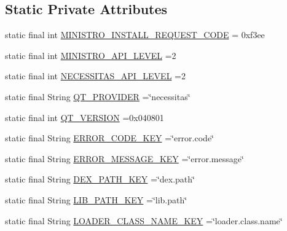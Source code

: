 \subsection*{Static Private Attributes}
\begin{DoxyCompactItemize}
\item 
static final int \hyperlink{classorg_1_1kde_1_1necessitas_1_1origo_1_1_qt_activity_a617b92d7a4d1c24eb3f828351c3fea07}{M\-I\-N\-I\-S\-T\-R\-O\-\_\-\-I\-N\-S\-T\-A\-L\-L\-\_\-\-R\-E\-Q\-U\-E\-S\-T\-\_\-\-C\-O\-D\-E} = 0xf3ee
\item 
static final int \hyperlink{classorg_1_1kde_1_1necessitas_1_1origo_1_1_qt_activity_a659118da1936f27736db994f82d89661}{M\-I\-N\-I\-S\-T\-R\-O\-\_\-\-A\-P\-I\-\_\-\-L\-E\-V\-E\-L} =2
\item 
static final int \hyperlink{classorg_1_1kde_1_1necessitas_1_1origo_1_1_qt_activity_aa7b8f51c3fe2b1cab3f75694b0023582}{N\-E\-C\-E\-S\-S\-I\-T\-A\-S\-\_\-\-A\-P\-I\-\_\-\-L\-E\-V\-E\-L} =2
\item 
static final String \hyperlink{classorg_1_1kde_1_1necessitas_1_1origo_1_1_qt_activity_a36c31c743ff4a2b8c364a4872f684343}{Q\-T\-\_\-\-P\-R\-O\-V\-I\-D\-E\-R} =\char`\"{}necessitas\char`\"{}
\item 
static final int \hyperlink{classorg_1_1kde_1_1necessitas_1_1origo_1_1_qt_activity_aaafca2c0ba4268de968bbb4a6dbdcabf}{Q\-T\-\_\-\-V\-E\-R\-S\-I\-O\-N} =0x040801
\item 
static final String \hyperlink{classorg_1_1kde_1_1necessitas_1_1origo_1_1_qt_activity_a9bc6099504df7d0b80744ba9c3f7906b}{E\-R\-R\-O\-R\-\_\-\-C\-O\-D\-E\-\_\-\-K\-E\-Y} =\char`\"{}error.\-code\char`\"{}
\item 
static final String \hyperlink{classorg_1_1kde_1_1necessitas_1_1origo_1_1_qt_activity_a9c6e8b211887201a43cc8b762042c486}{E\-R\-R\-O\-R\-\_\-\-M\-E\-S\-S\-A\-G\-E\-\_\-\-K\-E\-Y} =\char`\"{}error.\-message\char`\"{}
\item 
static final String \hyperlink{classorg_1_1kde_1_1necessitas_1_1origo_1_1_qt_activity_a4c2669f7673023d2fb9d3e8a5d9e82f7}{D\-E\-X\-\_\-\-P\-A\-T\-H\-\_\-\-K\-E\-Y} =\char`\"{}dex.\-path\char`\"{}
\item 
static final String \hyperlink{classorg_1_1kde_1_1necessitas_1_1origo_1_1_qt_activity_a3dfa8cb4dd668453d2b4a2a48fb580e5}{L\-I\-B\-\_\-\-P\-A\-T\-H\-\_\-\-K\-E\-Y} =\char`\"{}lib.\-path\char`\"{}
\item 
static final String \hyperlink{classorg_1_1kde_1_1necessitas_1_1origo_1_1_qt_activity_ac7e045c85bcac829258169df8ae96ecb}{L\-O\-A\-D\-E\-R\-\_\-\-C\-L\-A\-S\-S\-\_\-\-N\-A\-M\-E\-\_\-\-K\-E\-Y} =\char`\"{}loader.\-class.\-name\char`\"{}

\end{DoxyCompactItemize}
